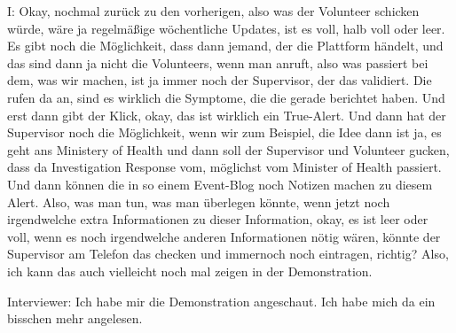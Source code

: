 I: Okay, nochmal zurück zu den vorherigen, also was der Volunteer schicken würde, wäre ja regelmäßige wöchentliche Updates, ist es voll, halb voll oder leer. Es gibt noch die Möglichkeit, dass dann jemand, der die Plattform händelt, und das sind dann ja nicht die Volunteers, wenn man anruft, also was passiert bei dem, was wir machen, ist ja immer noch der Supervisor, der das validiert. Die rufen da an, sind es wirklich die Symptome, die die gerade berichtet haben. Und erst dann gibt der Klick, okay, das ist wirklich ein True-Alert. Und dann hat der Supervisor noch die Möglichkeit, wenn wir zum Beispiel, die Idee dann ist ja, es geht ans Ministery of Health und dann soll der Supervisor und Volunteer gucken, dass da Investigation Response vom, möglichst vom Minister of Health passiert. Und dann können die in so einem Event-Blog noch Notizen machen zu diesem Alert. Also, was man tun, was man überlegen könnte, wenn jetzt noch irgendwelche extra Informationen zu dieser Information, okay, es ist leer oder voll, wenn es noch irgendwelche anderen Informationen nötig wären, könnte der Supervisor am Telefon das checken und immernoch noch eintragen, richtig? Also, ich kann das auch vielleicht noch mal zeigen in der Demonstration.

Interviewer: Ich habe mir die Demonstration angeschaut. Ich habe mich da ein bisschen mehr angelesen. 

